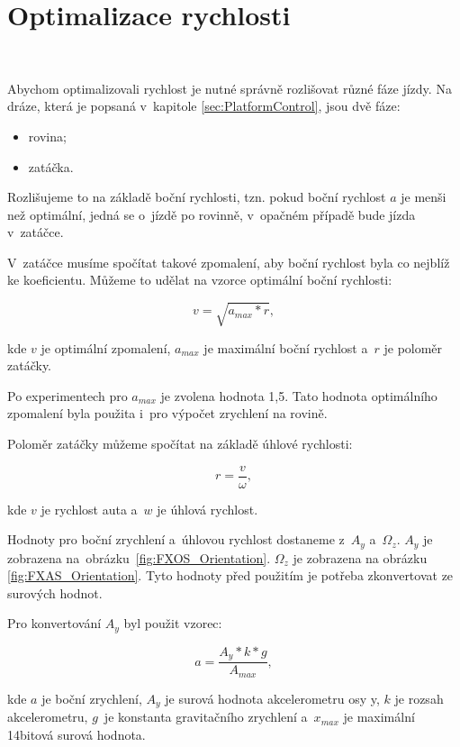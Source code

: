 \chapter{Optimalizace rychlosti}
\label{sec:SpeedOptimization}\

Abychom optimalizovali rychlost je nutné správně rozlišovat různé fáze jízdy. Na
dráze, která je popsaná v~kapitole \ref{sec:PlatformControl}, jsou dvě fáze:

\begin{itemize}
	\item{rovina;}
	\item{zatáčka.}
\end{itemize}

Rozlišujeme to na základě boční rychlosti, tzn. pokud boční rychlost $a$ je menši 
než optimální, jedná se o~jízdě po rovinně, v~opačném případě bude jízda v~zatáčce.

V~zatáčce musíme spočítat takové zpomalení, aby boční rychlost byla co nejblíž 
ke koeficientu. Můžeme to udělat na vzorce optimální boční rychlosti:

\begin{equation}
v = \sqrt{a_{max} * r},
\end{equation}

kde $v$ je optimální zpomalení, $a_{max}$ je maximální boční rychlost a~$r$ je 
poloměr zatáčky. 

Po experimentech pro $a_{max}$ je zvolena hodnota 1,5. Tato hodnota optimálního 
zpomalení byla použita i~pro výpočet zrychlení na rovině. 

Poloměr zatáčky můžeme spočítat na základě úhlové rychlosti:

\begin{equation}
r = \frac{v}{\omega},
\end{equation}

kde $v$ je rychlost auta a~$w$ je úhlová rychlost.

Hodnoty pro boční zrychlení a~úhlovou rychlost dostaneme z~$A_y$ a~$\Omega_z$. 
$A_y$ je zobrazena na~obrázku~\ref{fig:FXOS_Orientation}.  $\Omega_z$ je zobrazena 
na obrázku \ref{fig:FXAS_Orientation}. Tyto hodnoty před použitím je potřeba 
zkonvertovat ze surových hodnot.

Pro konvertování $A_y$ byl použit vzorec:

\begin{equation}
a = \frac{A_y * k * g}{A_{max}},
\end{equation}

kde $a$ je boční zrychlení, $A_y$ je surová hodnota akcelerometru osy y,
$k$ je rozsah akcelerometru,  $g$~je konstanta gravitačního zrychlení a~$x_{max}$ 
je maximální 14bitová surová hodnota.

